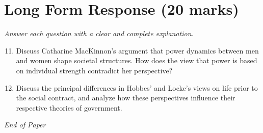 \documentclass[12pt]{article}
\begin{document}
\section*{Long Form Response (20 marks)}
\textit{Answer each question with a clear and complete explanation.}
\begin{enumerate}[label=\arabic*.]
\setcounter{enumi}{10}
\item Discuss Catharine MacKinnon's argument that power dynamics between men and women shape societal structures. How does the view that power is based on individual strength contradict her perspective?
\item Discuss the principal differences in Hobbes' and Locke's views on life prior to the social contract, and analyze how these perspectives influence their respective theories of government.
\end{enumerate}

\vfill
\noindent\textit{End of Paper}
\end{document}
